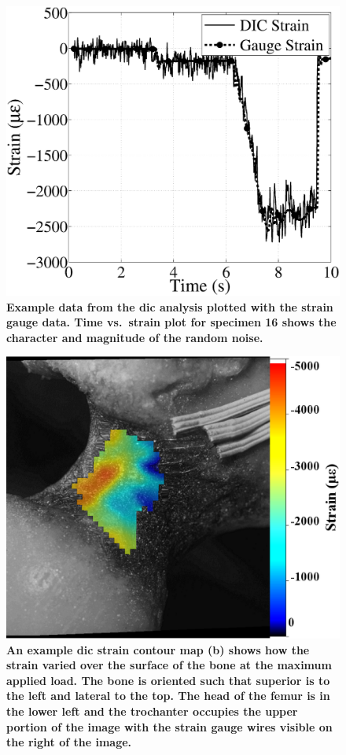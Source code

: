 \begin{figure}
	\centering
	\includegraphics[width=0.7\linewidth]{./impactor/figures/StrainExample/StrainsTogether}
	\caption[Example \acs*{dic} strain and strain gauge data]{\textbf{Example data from the \ac{dic} analysis plotted with the strain gauge data. Time vs.\ strain plot for specimen 16 shows the character and magnitude of the random noise.}}
\end{figure}

\begin{figure}
	\centering
	\includegraphics[width=0.7\linewidth]{./impactor/figures/StrainExample/H1376L_max_mod}
	\caption[Example surface strain data from the \acs*{dic} analysis]{\textbf{An example \ac{dic} strain contour map (b) shows how the strain varied over the surface of the bone at the maximum applied load. The bone is oriented such that superior is to the left and lateral to the top. The head of the femur is in the lower left and the trochanter occupies the upper portion of the image with the strain gauge wires visible on the right of the image.}}
	\label{fig:ExampleStrain}
\end{figure}

